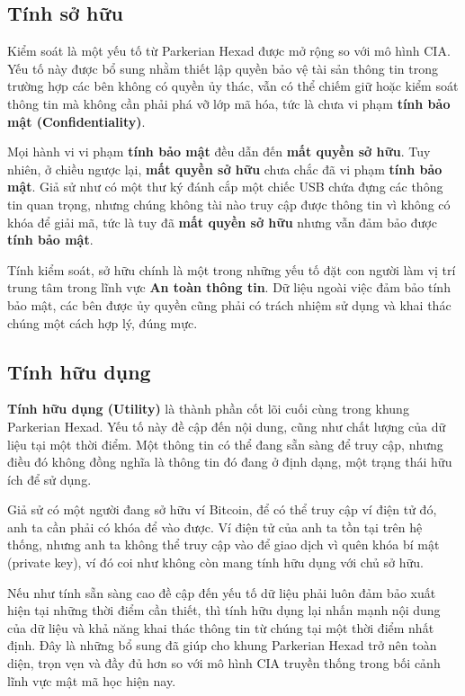 \subsection{Tính sở hữu}

Kiểm soát là một yếu tố từ Parkerian Hexad được mở rộng so với mô hình CIA. Yếu tố này được bổ sung nhằm thiết lập quyền bảo vệ tài sản thông tin trong trường hợp các bên không có quyền ủy thác, vẫn có thể chiếm giữ hoặc kiểm soát thông tin mà không cần phải phá vỡ lớp mã hóa, tức là chưa vi phạm \textbf{tính bảo mật (Confidentiality)}.

Mọi hành vi vi phạm \textbf{tính bảo mật} đều dẫn đến \textbf{mất quyền sở hữu}. Tuy nhiên, ở chiều ngược lại, \textbf{mất quyền sở hữu} chưa chắc đã vi phạm \textbf{tính bảo mật}. Giả sử như có một thư ký đánh cắp một chiếc USB chứa đựng các thông tin quan trọng, nhưng chúng không tài nào truy cập được thông tin vì không có khóa để giải mã, tức là tuy đã \textbf{mất quyền sở hữu} nhưng vẫn đảm bảo được \textbf{tính bảo mật}. \nocite{marinus_2009}

Tính kiểm soát, sở hữu chính là một trong những yếu tố đặt con người làm vị trí trung tâm trong lĩnh vực \textbf{An toàn thông tin}. Dữ liệu ngoài việc đảm bảo tính bảo mật, các bên được ủy quyền cũng phải có trách nhiệm sử dụng và khai thác chúng một cách hợp lý, đúng mực. 

\subsection{Tính hữu dụng}

\textbf{Tính hữu dụng (Utility)} là thành phần cốt lõi cuối cùng trong khung Parkerian Hexad. Yếu tố này đề cập đến nội dung, cũng như chất lượng của dữ liệu tại một thời điểm. Một thông tin có thể đang sẵn sàng để truy cập, nhưng điều đó không đồng nghĩa là thông tin đó đang ở định dạng, một trạng thái hữu ích để sử dụng. \nocite{parker2010our}

 Giả sử có một người đang sở hữu ví Bitcoin, để có thể truy cập ví điện tử đó, anh ta cần phải có khóa để vào được. Ví điện tử của anh ta tồn tại trên hệ thống, nhưng anh ta không thể truy cập vào để giao dịch vì quên khóa bí mật (private key), ví đó coi như không còn mang tính hữu dụng với chủ sở hữu.
 
 Nếu như tính sẵn sàng cao đề cập đến yếu tố dữ liệu phải luôn đảm bảo xuất hiện tại những thời điểm cần thiết, thì tính hữu dụng lại nhấn mạnh nội dung của dữ liệu và khả năng khai thác thông tin từ chúng tại một thời điểm nhất định. Đây là những bổ sung đã giúp cho khung Parkerian Hexad trở nên toàn diện, trọn vẹn và đầy đủ hơn so với mô hình CIA truyền thống trong bối cảnh lĩnh vực mật mã học hiện nay.

